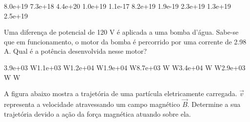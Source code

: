 \documentclass[12pt, addpoints]{exam}
\begin{document}
\begin{questions}
\begin{multicols*}{2}
\begin{oneparchoices}
\choice 8.0e+19 \choice 7.3e+18 \choice 4.4e+20 \choice 1.0e+19 \choice 1.1e-17 \choice 8.2e+19 \choice 1.9e-19 \choice 2.3e+19 \choice 1.3e+19 \choice 2.5e+19 
\end{oneparchoices}\question Uma diferença de potencial de 120 V é aplicada a uma bomba d’água. Sabe-se que em funcionamento, o motor da bomba é percorrido por uma corrente de    2.98 A. Qual é a potência desenvolvida nesse motor?

\begin{oneparchoices}
\choice 3.9e+03 W\choice 1.1e+03 W\choice 1.2e+04 W\choice 1.9e+04 W\choice 8.7e+03 W W\choice 3.4e+04 W W\choice 2.9e+03 W W
\end{oneparchoices}\question A ﬁgura abaixo mostra a trajetória de uma partícula eletricamente carregada. $\vec{{v}}$ representa a velocidade atravessando um campo magnético $\vec{{B}}$. Determine a sua trajetória devido a ação da força magnética atuando sobre ela.
        
        \begin{center}
            \begin{minipage}[c]{0.5\linewidth}
            \end{minipage}
        \end{center}

        


\end{multicols*}
\end{questions}
\end{document}
